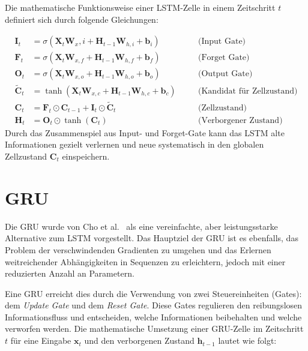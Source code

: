 Die mathematische Funktionsweise einer \ac{LSTM}-Zelle in einem Zeitschritt $t$ definiert sich durch folgende Gleichungen:

\begin{align}
    \mathbf{I}_t &= \sigma( \mathbf{X}_t \mathbf{W}_x,i + \mathbf{H}_{t-1} \mathbf{W}_{h,i} + \mathbf{b}_i) \quad &&\text{(Input Gate)} \\
    \mathbf{F}_t &= \sigma(\mathbf{X}_t \mathbf{W}_{x,f} + \mathbf{H}_{t-1} \mathbf{W}_{h,f}  + \mathbf{b}_f) \quad &&\text{(Forget Gate)} \\
    \mathbf{O}_t &= \sigma(\mathbf{X}_t \mathbf{W}_{x,o} + \mathbf{H}_{t-1} \mathbf{W}_{h,o} + \mathbf{b}_o) \quad &&\text{(Output Gate)} \\
    \tilde{\mathbf{C}}_t &= \tanh(\mathbf{X}_t \mathbf{W}_{x,c} + \mathbf{H}_{t-1} \mathbf{W}_{h,c} + \mathbf{b}_c) \quad &&\text{(Kandidat für Zellzustand)} \\
    \mathbf{C}_t &= \mathbf{F}_t \odot \mathbf{C}_{t-1} + \mathbf{I}_t \odot \tilde{\mathbf{C}}_t \quad &&\text{(Zellzustand)} \\
    \mathbf{H}_t &= \mathbf{O}_t \odot \tanh(\mathbf{C}_t) \quad &&\text{(Verborgener Zustand)}
\end{align}
Durch das Zusammenspiel aus Input- und Forget-Gate kann das \acs{LSTM} alte Informationen gezielt verlernen und neue systematisch in den globalen Zellzustand $\mathbf{C}_t$ einspeichern.

\section[GRU]{\texorpdfstring{\acs{GRU}}{GRU}}

Die \ac{GRU} wurde von Cho et al.\ \autocite{Cho2014} als eine vereinfachte, aber leistungsstarke Alternative zum \acs{LSTM} vorgestellt. Das Hauptziel der \ac{GRU} ist es ebenfalls, das Problem der verschwindenden Gradienten zu umgehen und das Erlernen weitreichender Abhängigkeiten in Sequenzen zu erleichtern, jedoch mit einer reduzierten Anzahl an Parametern.

Eine \ac{GRU} erreicht dies durch die Verwendung von zwei Steuereinheiten (Gates): dem \textit{Update Gate} und dem \textit{Reset Gate}. Diese Gates regulieren den reibungslosen Informationsfluss und entscheiden, welche Informationen beibehalten und welche verworfen werden.
Die mathematische Umsetzung einer \ac{GRU}-Zelle im Zeitschritt $t$ für eine Eingabe $\mathbf{x}_t$ und den verborgenen Zustand $\mathbf{h}_{t-1}$ lautet wie folgt:

